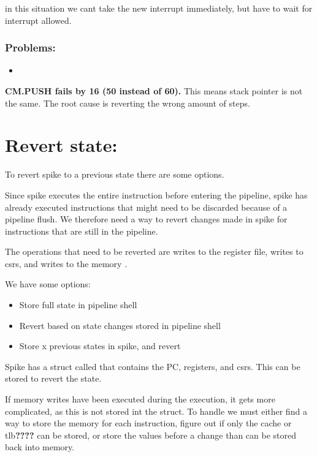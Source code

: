 in this situation we cant take the new interrupt immediately, but have to wait for interrupt allowed.



\subsubsection{Problems:}
\begin{itemize}
    \item 
\end{itemize}

\textbf{CM.PUSH fails by 16 (50 instead of 60).} This means stack pointer is not the same. The root cause is reverting the wrong amount of steps.


\section{Revert state: }

To revert spike to a previous state there are some options.

Since spike executes the entire instruction before entering the pipeline, spike has already executed instructions that might need to be discarded because of a pipeline flush. We therefore need a way to revert changes made in spike for instructions that are still in the pipeline.

The operations that need to be reverted are writes to the register file, writes to \acrshort{csr}s, and writes to the memory \cite{}.

We have some options:
\begin{itemize}
    \item Store full state in pipeline shell
    \item Revert based on state changes stored in pipeline shell
    \item Store x previous states in spike, and revert
\end{itemize}

Spike has a struct called  that contains the PC, registers, and csrs. This can be stored to revert the state. 

If memory writes have been executed during the execution, it gets more complicated, as this is not stored int the  struct. To handle we must either find a way to store the memory for each instruction, figure out if only the cache or tlb\textbf{????} can be stored, or store the values before a change than can be stored back into memory.







